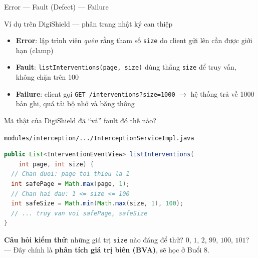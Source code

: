 \documentclass[aspectratio=169,12pt]{beamer}
\begin{document}
\begin{frame}[fragile]{Error --- Fault (Defect) --- Failure}
  \begin{center}
  \end{center}

  \vspace{0.5em}
  \begin{exampleblock}{Ví dụ trên DigiShield --- phân trang nhật ký can thiệp}
    \begin{itemize}
      \item \textbf{Error}: lập trình viên \textit{quên} rằng tham số \texttt{size}
            do client gửi lên cần được giới hạn (clamp)
      \item \textbf{Fault}: \texttt{listInterventions(page, size)} dùng thẳng
            \texttt{size} để truy vấn, không chặn trên 100
      \item \textbf{Failure}: client gọi \texttt{GET /interventions?size=1000}
            $\to$ hệ thống trả về 1000 bản ghi, quá tải bộ nhớ và băng thông
    \end{itemize}
  \end{exampleblock}
\end{frame}

\begin{frame}[fragile]{Mã thật của DigiShield đã ``vá'' fault đó thế nào?}
  \begin{block}{\small \texttt{modules/interception/.../InterceptionServiceImpl.java}}
\begin{lstlisting}[language=java]
public List<InterventionEventView> listInterventions(
    int page, int size) {
  // Chan duoi: page toi thieu la 1
  int safePage = Math.max(page, 1);
  // Chan hai dau: 1 <= size <= 100
  int safeSize = Math.min(Math.max(size, 1), 100);
  // ... truy van voi safePage, safeSize
}
\end{lstlisting}
  \end{block}

  \vspace{0.2em}
  \small
  \textbf{Câu hỏi kiểm thử}: những giá trị \texttt{size} nào đáng để thử?
  $0$, $1$, $2$, $99$, $100$, $101$? --- Đây chính là \textbf{phân tích giá trị biên
  (BVA)}, sẽ học ở Buổi 8.
\end{frame}
\end{document}
